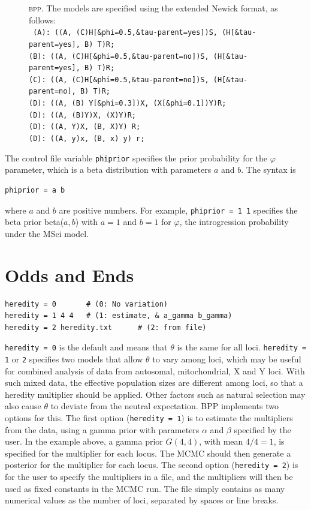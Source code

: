 \documentclass[a4paper]{book}
\numberwithin{equation}{section} \renewcommand{\baselinestretch}{0.55}
\begin{document}
\begin{figure} [t]
{    \textsc{bpp}.  The models are
    specified using the extended Newick format, as follows: \\
    \texttt{
      (A): ((A, (C)H[\&phi=0.5,\&tau-parent=yes])S, (H[\&tau-parent=yes], B) T)R; \\
      (B): ((A, (C)H[\&phi=0.5,\&tau-parent=no])S, (H[\&tau-parent=yes], B) T)R; \\
      (C): ((A, (C)H[\&phi=0.5,\&tau-parent=no])S, (H[\&tau-parent=no], B) T)R; \\
      (D): ((A, (B) Y[\&phi=0.3])X, (X[\&phi=0.1])Y)R; \\
      (D): ((A, (B)Y)X, (X)Y)R; \\
      (D): ((A, Y)X, (B, X)Y) R; \\
      (D): ((A, y)x, (B, x) y) r; } } \label{fig-msci-models}
\end{figure}
The control file variable \texttt{phiprior} specifies the prior
probability for the $\varphi$ parameter, which is a beta distribution
with parameters $a$ and $b$.  The syntax is
\begin{verbatim}
phiprior = a b
\end{verbatim}
where $a$ and $b$ are positive numbers. For example, \texttt{phiprior
  = 1 1} specifies the beta prior beta($a, b$) with $a = 1$ and
$b = 1$ for $\varphi$, the introgression probability under the MSci
model.

\chapter{Odds and Ends}


\begin{verbatim}
heredity = 0       # (0: No variation)
heredity = 1 4 4   # (1: estimate, & a_gamma b_gamma)
heredity = 2 heredity.txt      # (2: from file)
\end{verbatim}

\texttt{heredity = 0} is the default and means that $\theta$ is the
same for all loci. \texttt{heredity = 1} or \texttt{2} specifies two
models that allow $\theta$ to vary among loci, which may be useful for
combined analysis of data from autosomal, mitochondrial, X and Y loci.
With such mixed data, the effective population sizes are different
among loci, so that a heredity multiplier \citep[inheritance
scalars][]{Hey2004} should be applied.  Other factors such as natural
selection may also cause $\theta$ to deviate from the neutral
expectation.  \textsc{BPP} implements two options for this.  The first
option (\texttt{heredity = 1}) is to estimate the multipliers from the
data, using a gamma prior with parameters $\alpha$ and $\beta$
specified by the user.  In the example above, a gamma prior $G(4, 4)$,
with mean $4/4 = 1$, is specified for the multiplier for each locus.
The MCMC should then generate a posterior for the multiplier for each
locus.  The second option (\texttt{heredity = 2}) is for the user to
specify the multipliers in a file, and the multipliers will then be
used as fixed constants in the MCMC run.  The file simply contains as
many numerical values as the number of loci, separated by spaces or
line breaks.
\end{document}
